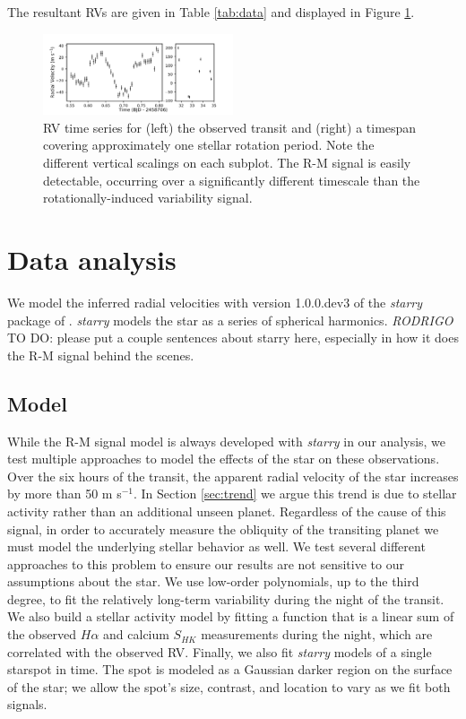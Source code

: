 \documentclass[twocolumn]{aastex63}
\newcommand{\todo}[3]{{\color{#2} \emph{#1} TO DO: #3}}
\begin{document}
The resultant RVs are given in Table \ref{tab:data} and displayed in Figure \ref{fig:data}.



\begin{figure}[!tbh]
  \begin{center}
    \includegraphics[width=0.5\textwidth, trim={0cm 0.0cm 0cm 0cm}, clip=true]{../figures/all_data.pdf}
   \end{center}
  \caption{RV time series for (left) the observed transit and (right) a timespan covering approximately one stellar rotation period. Note the different vertical scalings on each subplot. The R-M signal is easily detectable, occurring over a significantly different timescale than the rotationally-induced variability signal.}
  \label{fig:data}
\end{figure}



\section{Data analysis}
\label{sec:analysis}

We model the inferred radial velocities with version 1.0.0.dev3 of the \textit{starry} package of \citet{Luger19}. 
\textit{starry} models the star as a series of spherical harmonics. 
\todo{RODRIGO}{red}{please put a couple sentences about starry here, especially in how it does the R-M signal behind the scenes.}


\subsection{Model}
\label{sec:model}

While the R-M signal model is always developed with \textit{starry} in our analysis, we test multiple approaches to model the effects of the star on these observations.
Over the six hours of the transit, the apparent radial velocity of the star increases by more than 50 m s$^{-1}$. 
In Section \ref{sec:trend} we argue this trend is due to stellar activity rather than an additional unseen planet.
Regardless of the cause of this signal, in order to accurately measure the obliquity of the transiting planet we must model the underlying stellar behavior as well.
We test several different approaches to this problem to ensure our results are not sensitive to our assumptions about the star.
We use low-order polynomials, up to the third degree, to fit the relatively long-term variability during the night of the transit. 
We also build a stellar activity model by fitting a function that is a linear sum of the observed $H\alpha$ and calcium $S_{HK}$ measurements during the night, which are correlated with the observed RV.
Finally, we also fit \textit{starry} models of a single starspot in time. The spot is modeled as a Gaussian darker region on the surface of the star; we allow the spot's size, contrast, and location to vary as we fit both signals.
\end{document}
